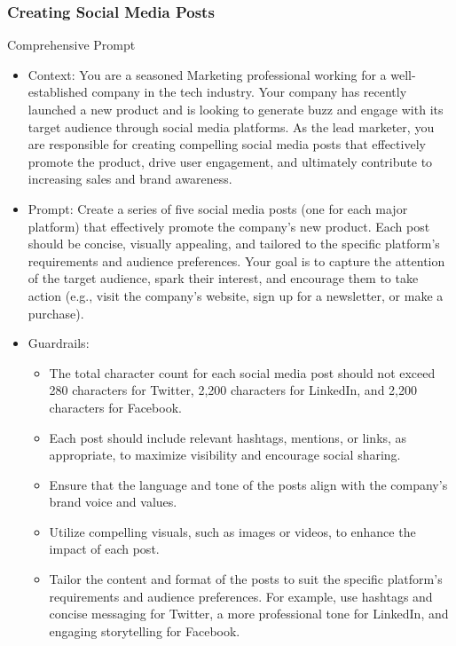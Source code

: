 \begin{frame}[fragile]\frametitle{Creating Social Media Posts}
Comprehensive Prompt
{\tiny
\begin{itemize}
\item Context: You are a seasoned Marketing professional working for a well-established company in the tech industry. Your company has recently launched a new product and is looking to generate buzz and engage with its target audience through social media platforms. As the lead marketer, you are responsible for creating compelling social media posts that effectively promote the product, drive user engagement, and ultimately contribute to increasing sales and brand awareness.
\item Prompt: Create a series of five social media posts (one for each major platform) that effectively promote the company's new product. Each post should be concise, visually appealing, and tailored to the specific platform's requirements and audience preferences. Your goal is to capture the attention of the target audience, spark their interest, and encourage them to take action (e.g., visit the company's website, sign up for a newsletter, or make a purchase).
\item Guardrails: 
	\begin{itemize}
	\item The total character count for each social media post should not exceed 280 characters for Twitter, 2,200 characters for LinkedIn, and 2,200 characters for Facebook.
	\item Each post should include relevant hashtags, mentions, or links, as appropriate, to maximize visibility and encourage social sharing.
	\item Ensure that the language and tone of the posts align with the company's brand voice and values.
	\item Utilize compelling visuals, such as images or videos, to enhance the impact of each post.
	\item Tailor the content and format of the posts to suit the specific platform's requirements and audience preferences. For example, use hashtags and concise messaging for Twitter, a more professional tone for LinkedIn, and engaging storytelling for Facebook.
	\end{itemize}	
\end{itemize}
}
\end{frame}

